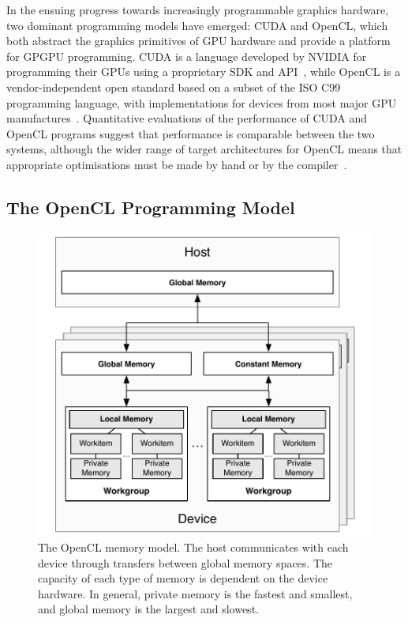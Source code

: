 In the ensuing progress towards increasingly programmable graphics
hardware, two dominant programming models have emerged: CUDA and
OpenCL, which both abstract the graphics primitives of GPU hardware
and provide a platform for GPGPU programming. CUDA is a language
developed by NVIDIA for programming their GPUs using a proprietary SDK
and API~\cite{Nvidia2007}, while OpenCL is a vendor-independent open
standard based on a subset of the ISO C99 programming language, with
implementations for devices from most major GPU
manufactures~\cite{Stone2010}. Quantitative evaluations of the
performance of CUDA and OpenCL programs suggest that performance is
comparable between the two systems, although the wider range of target
architectures for OpenCL means that appropriate optimisations must be
made by hand or by the compiler~\cite{Komatsu2010,Karimi2010}.


\subsection{The OpenCL Programming Model}

\begin{figure}
\centering
\includegraphics[width=0.5
\textwidth]{img/opencl-memory}
\caption{%
  The OpenCL memory model. The host communicates with each device
  through transfers between global memory spaces. The capacity of each
  type of memory is dependent on the device hardware. In general,
  private memory is the fastest and smallest, and global memory is the
  largest and slowest.%
}
\label{fig:opencl-memory}
\end{figure}


